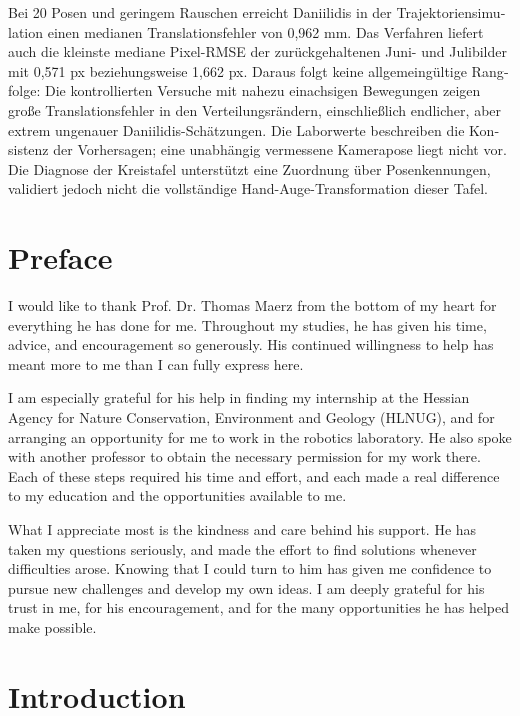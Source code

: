 \documentclass[12pt,a4paper]{article}
\begin{document}
\begin{otherlanguage}{ngerman}
Bei 20 Posen und geringem Rauschen erreicht Daniilidis in der Trajektoriensimulation einen medianen Translationsfehler von 0,962 mm. Das Verfahren liefert auch die kleinste mediane Pixel-RMSE der zur\"uckgehaltenen Juni- und Julibilder mit 0,571 px beziehungsweise 1,662 px. Daraus folgt keine allgemeing\"ultige Rangfolge: Die kontrollierten Versuche mit nahezu einachsigen Bewegungen zeigen gro\ss e Translationsfehler in den Verteilungsr\"andern, einschlie\ss lich endlicher, aber extrem ungenauer Daniilidis-Sch\"atzungen. Die Laborwerte beschreiben die Konsistenz der Vorhersagen; eine unabh\"angig vermessene Kamerapose liegt nicht vor. Die Diagnose der Kreistafel unterst\"utzt eine Zuordnung \"uber Posenkennungen, validiert jedoch nicht die vollst\"andige Hand-Auge-Transformation dieser Tafel. \cite{experimentcode,eauncertainty}
\end{otherlanguage}

\clearpage
\section*{Preface}
I would like to thank Prof. Dr. Thomas Maerz from the bottom of my heart for everything he has done for me. Throughout my studies, he has given his time, advice, and encouragement so generously. His continued willingness to help has meant more to me than I can fully express here.

I am especially grateful for his help in finding my internship at the Hessian Agency for Nature Conservation, Environment and Geology (HLNUG), and for arranging an opportunity for me to work in the robotics laboratory. He also spoke with another professor to obtain the necessary permission for my work there. Each of these steps required his time and effort, and each made a real difference to my education and the opportunities available to me.

What I appreciate most is the kindness and care behind his support. He has taken my questions seriously, and made the effort to find solutions whenever difficulties arose. Knowing that I could turn to him has given me confidence to pursue new challenges and develop my own ideas. I am deeply grateful for his trust in me, for his encouragement, and for the many opportunities he has helped make possible.

\clearpage
\tableofcontents
\clearpage
{}

\clearpage
\section{Introduction}\label{sec:introduction}
\end{document}
